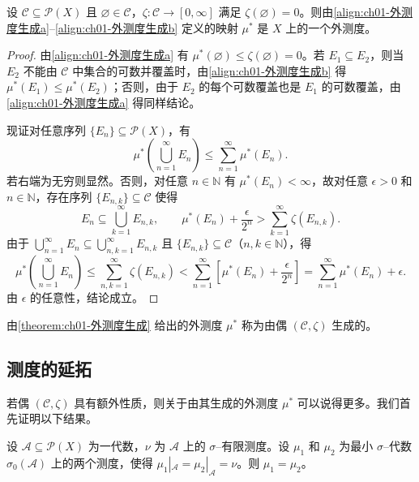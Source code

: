 \documentclass[../../main.tex]{subfiles}%
\begin{document}
\begin{theorem}\label{theorem:ch01-外测度生成}
\label{theorem:ch01-外测度}
设 $\mathcal{C}\subseteq\mathcal{P}(X)$ 且 $\varnothing \in\mathcal{C}$，$\zeta:\mathcal{C}\to[0,\infty]$ 满足 $\zeta(\varnothing )=0$。则由\eqref{align:ch01-外测度生成a}--\eqref{align:ch01-外测度生成b} 定义的映射 $\mu^*$ 是 $X$ 上的一个外测度。
\end{theorem}

\begin{proof}
由\eqref{align:ch01-外测度生成a} 有 $\mu^*(\varnothing )\leqslant\zeta(\varnothing )=0$。若 $E_1\subseteq E_2$，则当 $E_2$ 不能由 $\mathcal{C}$ 中集合的可数并覆盖时，由\eqref{align:ch01-外测度生成b} 得 $\mu^*(E_1)\leqslant\mu^*(E_2)$；否则，由于 $E_2$ 的每个可数覆盖也是 $E_1$ 的可数覆盖，由\eqref{align:ch01-外测度生成a} 得同样结论。

现证对任意序列 $\{E_n\}\subseteq\mathcal{P}(X)$，有
\[
\mu^*\left(\bigcup_{n=1}^\infty E_n\right)\leqslant\sum_{n=1}^\infty\mu^*(E_n).
\]
若右端为无穷则显然。否则，对任意 $n\in\mathbb{N}$ 有 $\mu^*(E_n)<\infty$，故对任意 $\epsilon>0$ 和 $n\in\mathbb{N}$，存在序列 $\{E_{n,k}\}\subseteq\mathcal{C}$ 使得
\[
E_n\subseteq\bigcup_{k=1}^\infty E_{n,k},\qquad
\mu^*(E_n)+\frac{\epsilon}{2^n}>\sum_{k=1}^\infty\zeta(E_{n,k}).
\]
由于 $\bigcup_{n=1}^\infty E_n\subseteq\bigcup_{n,k=1}^\infty E_{n,k}$ 且 $\{E_{n,k}\}\subseteq\mathcal{C}$（$n,k\in\mathbb{N}$），得
\[
\mu^*\left(\bigcup_{n=1}^\infty E_n\right)\leqslant\sum_{n,k=1}^\infty\zeta(E_{n,k})
<\sum_{n=1}^\infty\left[\mu^*(E_n)+\frac{\epsilon}{2^n}\right]
=\sum_{n=1}^\infty\mu^*(E_n)+\epsilon.
\]
由 $\epsilon$ 的任意性，结论成立。
\end{proof}

\begin{definition}\label{definition:ch01-外测度生成定义}
由\cref{theorem:ch01-外测度生成} 给出的外测度 $\mu^*$ 称为由偶 $(\mathcal{C},\zeta)$ 生成的。
\end{definition}

\subsection{测度的延拓}\label{subsection:ch01-测度延拓}
若偶 $(\mathcal{C},\zeta)$ 具有额外性质，则关于由其生成的外测度 $\mu^*$ 可以说得更多。我们首先证明以下结果。

\begin{proposition}[重合准则]\label{proposition:ch01-重合准则}
设 $\mathcal{A}\subseteq\mathcal{P}(X)$ 为一代数，$\nu$ 为 $\mathcal{A}$ 上的 $\sigma$--有限测度。设 $\mu_1$ 和 $\mu_2$ 为最小 $\sigma$--代数 $\sigma_0(\mathcal{A})$ 上的两个测度，使得 $\mu_1|_{\mathcal{A}}=\mu_2|_{\mathcal{A}}=\nu$。则 $\mu_1=\mu_2$。
\end{proposition}
\end{document}
